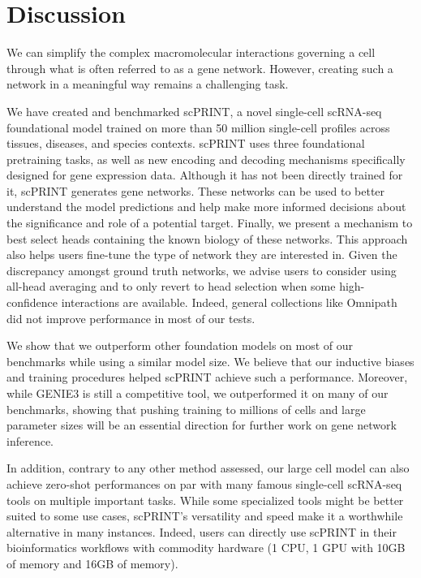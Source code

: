 \section{Discussion}

We can simplify the complex macromolecular interactions governing a cell through what is often referred to as a gene network. However, creating such a network in a meaningful way remains a challenging task.

We have created and benchmarked \gls{scPRINT}, a novel single-cell \gls{scRNA-seq} foundational model trained on more than 50 million single-cell profiles across tissues, diseases, and species contexts. \gls{scPRINT} uses three foundational pretraining tasks, as well as new encoding and decoding mechanisms specifically designed for gene expression data. Although it has not been directly trained for it, \gls{scPRINT} generates gene networks. These networks can be used to better understand the model predictions and help make more informed decisions about the significance and role of a potential target. Finally, we present a mechanism to best select heads containing the known biology of these networks. This approach also helps users fine-tune the type of network they are interested in. Given the discrepancy amongst ground truth networks, we advise users to consider using all-head averaging and to only revert to head selection when some high-confidence interactions are available. Indeed, general collections like Omnipath did not improve performance in most of our tests.

We show that we outperform other foundation models on most of our benchmarks while using a similar model size. We believe that our inductive biases and training procedures helped \gls{scPRINT} achieve such a performance. Moreover, while GENIE3 is still a competitive tool, we outperformed it on many of our benchmarks, showing that pushing training to millions of cells and large parameter sizes will be an essential direction for further work on gene network inference.

In addition, contrary to any other method assessed, our large cell model can also achieve zero-shot performances on par with many famous single-cell \gls{scRNA-seq} tools on multiple important tasks. While some specialized tools might be better suited to some use cases, \gls{scPRINT}'s versatility and speed make it a worthwhile alternative in many instances. Indeed, users can directly use \gls{scPRINT} in their bioinformatics workflows with commodity hardware (1 CPU, 1 \gls{GPU} with 10GB of memory and 16GB of memory).


